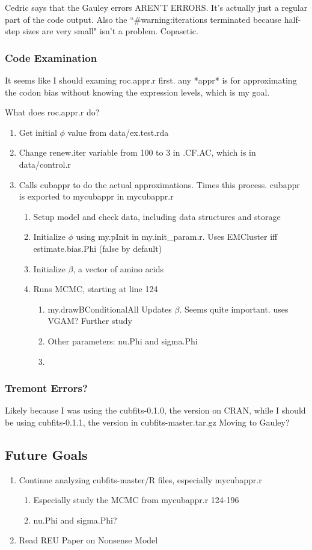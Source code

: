 \documentclass[11pt]{article} %
\begin{document}
Cedric says that the Gauley errors AREN'T ERRORS. It's actually just a regular part of the code output. Also the ``\#warning:iterations terminated because half-step sizes are very small" isn't a problem. Copasetic.

\subsubsection{Code Examination}
It seems like I should examing roc.appr.r first. any *appr* is for approximating the codon bias without knowing the expression levels, which is my goal.

What does roc.appr.r do?
\begin{enumerate}	%
\item Get initial $\phi$ value from data/ex.test.rda
\item Change renew.iter variable from 100 to 3 in .CF.AC, which is in data/control.r
\item Calls cubappr to do the actual approximations. Times this process. cubappr is exported to mycubappr in mycubappr.r
	\begin{enumerate}	%
	\item Setup model and check data, including data structures and storage
	\item Initialize $\phi$ using my.pInit in my.init\_param.r. Uses EMCluster iff estimate.bias.Phi (false by default)
	\item Initialize $\beta$, a vector of amino acids
	\item Runs MCMC, starting at line 124
		\begin{enumerate}	%
		\item my.drawBConditionalAll 
Updates $\beta$. Seems quite important. uses VGAM? Further study
		\item Other parameters:  nu.Phi and sigma.Phi
		\item 
		\end{enumerate}		%


	\end{enumerate} 	%
\end{enumerate}		%

\subsubsection{Tremont Errors?}
Likely because I was using the cubfits-0.1.0, the version on CRAN, while I should be using cubfits-0.1.1, the version in cubfits-master.tar.gz
Moving to Gauley?

\subsection{Future Goals}
\begin{enumerate}
\item Continue analyzing cubfits-master/R files, especially mycubappr.r 
\begin{enumerate}
\item Especially study the MCMC from mycubappr.r 124-196
\item nu.Phi and sigma.Phi?
\end{enumerate}

\item Read REU Paper on Nonsense Model
\end{enumerate}
\end{document}
